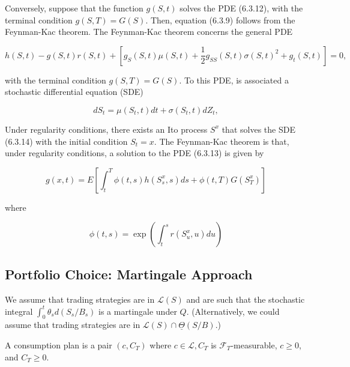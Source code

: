 \documentclass[\topdir/lecture\_notes.tex]{subfiles}
\begin{document}
Conversely, suppose that the function \(g(S, t)\) solves the PDE (6.3.12), with the terminal condition \(g(S, T)=G(S)\). Then, equation (6.3.9) follows from the Feynman-Kac theorem. The Feynman-Kac theorem concerns the general PDE

\begin{equation}
h(S, t)-g(S, t) r(S, t)+\left[g_{S}(S, t) \mu(S, t)+\frac{1}{2} g_{S S}(S, t) \sigma(S, t)^{2}+g_{t}(S, t)\right]=0, \label{eq:6.3.13}
\end{equation}

with the terminal condition \(g(S, T)=G(S)\). To this PDE, is associated a stochastic differential equation (SDE)

\begin{equation}
d S_{t}=\mu\left(S_{t}, t\right) d t+\sigma\left(S_{t}, t\right) d Z_{t}, \label{eq:6.3.14}
\end{equation}

Under regularity conditions, there exists an Ito process \(S^{x}\) that solves the SDE (6.3.14) with the initial condition \(S_{t}=x\). The Feynman-Kac theorem is that, under regularity conditions, a solution to the PDE (6.3.13) is given by

\begin{equation}
g(x, t)=E\left[\int_{t}^{T} \phi(t, s) h\left(S_{s}^{x}, s\right) d s+\phi(t, T) G\left(S_{T}^{x}\right)\right]
\end{equation}

where

\begin{equation}
\phi(t, s)=\exp \left(\int_{t}^{s} r\left(S_{u}^{x}, u\right) d u\right)
\end{equation}



\subsection{Portfolio Choice: Martingale Approach}
We assume that trading strategies are in \(\mathcal{L}(S)\) and are such that the stochastic integral \(\int_{0}^{t} \theta_{s} d\left(S_{s} / B_{s}\right)\) is a martingale under \(Q\). (Alternatively, we could assume that trading strategies are in \(\mathcal{L}(S) \cap \underline{\Theta}(S / B)\).)

\begin{defn}\label{def:6.5.1}
A consumption plan is a pair \(\left(c, C_{T}\right)\) where \(c \in \mathcal{L}, C_{T}\) is \(\mathcal{F}_{T}\)-measurable, \(c \geq 0\), and \(C_{T} \geq 0\).
\end{defn}
\end{document}
